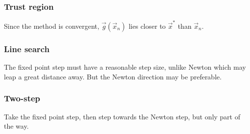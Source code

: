 \documentclass{beamer}
\begin{document}
\begin{frame}
\frametitle{Trust region}

Since the method is convergent, $\vec{g}(\vec{x}_n)$ lies closer to $\vec{x}^*$ than $\vec{x}_n$.


\end{frame}

\begin{frame}
\frametitle{Line search}

The fixed point step must have a reasonable step size, unlike Newton which may leap a great distance away.
But the Newton direction may be preferable.


\end{frame}

\begin{frame}
\frametitle{Two-step}

Take the fixed point step, then step towards the Newton step, but only part of the way.


\end{frame}
\end{document}
